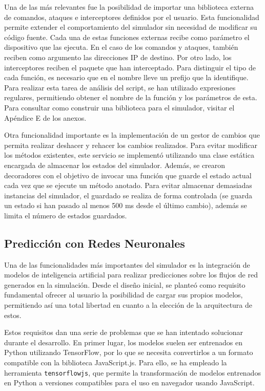 Una de las más relevantes fue la posibilidad de importar una biblioteca externa de comandos, ataques e interceptores definidos por el usuario. Esta funcionalidad permite extender el comportamiento del simulador sin necesidad de modificar su código fuente. Cada una de estas funciones externas recibe como parámetro el dispositivo que las ejecuta. En el caso de los comandos y ataques, también reciben como argumento las direcciones IP de destino. Por otro lado, los interceptores reciben el paquete que han interceptado. Para distinguir el tipo de cada función, es necesario que en el nombre lleve un prefijo que la identifique. Para realizar esta tarea de análisis del script, se han utilizado expresiones regulares, permitiendo obtener el nombre de la función y los parámetros de esta. Para consultar como construir una biblioteca para el simulador, visitar el Apéndice E de los anexos.

Otra funcionalidad importante es la implementación de un gestor de cambios que permita realizar deshacer y rehacer los cambios realizados. Para evitar modificar los métodos existentes, este servicio se implementó utilizando una clase estática encargada de almacenar los estados del simulador. Además, se crearon decoradores con el objetivo de invocar una función que guarde el estado actual cada vez que se ejecute un método anotado. Para evitar almacenar demasiadas instancias del simulador, el guardado se realiza de forma controlada (se guarda un estado si han pasado al menos 500 ms desde el último cambio), además se limita el número de estados guardados.

\subsection{Predicción con Redes Neuronales}
\label{subsec:PrediccionRedesNeuronales}
Una de las funcionalidades más importantes del simulador es la integración de modelos de inteligencia artificial para realizar predicciones sobre los flujos de red generados en la simulación. Desde el diseño inicial, se planteó como requisito fundamental ofrecer al usuario la posibilidad de cargar sus propios modelos, permitiendo así una total libertad en cuanto a la elección de la arquitectura de estos.

Estos requisitos dan una serie de problemas que se han intentado solucionar durante el desarrollo. En primer lugar, los modelos suelen ser entrenados en Python utilizando TensorFlow, por lo que se necesita convertirlos a un formato compatible con la biblioteca JavaScript.js. Para ello, se ha empleado la herramienta \texttt{tensorflowjs}, que permite la transformación de modelos entrenados en Python a versiones compatibles para el uso en navegador usando JavaScript.

